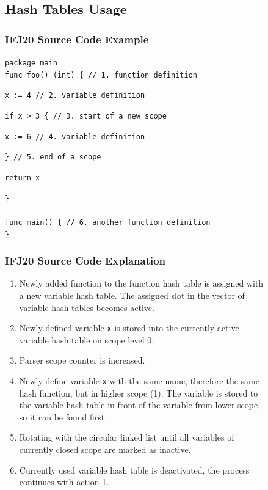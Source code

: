\documentclass[12pt]{article}
\begin{document}
\newpage
\begin{figure}
\subsection{Hash Tables Usage}
\subsubsection{IFJ20 Source Code Example}
\texttt{package main}\\

\texttt{func foo() (int) \{ \textcolor{comment}{// 1. function definition}}

\hspace{0.8cm} \texttt{x := 4 \textcolor{comment}{// 2. variable definition}}

\hspace{0.8cm} \texttt{if x > 3 \{ \textcolor{comment}{// 3. start of a new scope}}

\hspace{1.6cm} \texttt{x := 6 \textcolor{comment}{// 4. variable definition}}

\hspace{0.8cm} \texttt{\} \textcolor{comment}{// 5. end of a scope}}

\hspace{0.8cm}\texttt{return x}

\texttt{\}\\
\\
func main() \{ \textcolor{comment}{// 6. another function definition}\\
\}}\\
\subsubsection{IFJ20 Source Code Explanation}
\begin{enumerate}
\item{Newly added function to the function hash table is assigned with a new variable hash table. The assigned slot in the vector of variable hash tables becomes active.}
\item{Newly defined variable \texttt{x} is stored into the currently active variable hash table on scope level 0.}
\item{Parser scope counter is increased.}
\item{Newly define variable \texttt{x} with the same name, therefore the same hash function, but in higher scope (1). The variable is stored to the variable hash table in front of the variable from lower scope, so it can be found first.}
\item{Rotating with the circular linked list until all variables of currently closed scope are marked as inactive.}
\item{Currently used variable hash table is deactivated, the process continues with action 1.}
\end{enumerate}
\vspace{8cm}
\end{figure}
\end{document}
